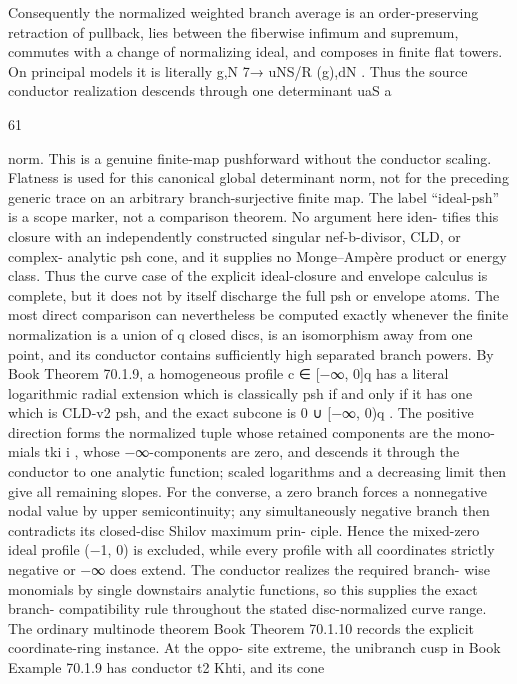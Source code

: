 \documentclass[11pt]{article}
\begin{document}
\begin{OriginalTaskDATA}
Consequently the normalized weighted branch average is an order-preserving retraction of
pullback, lies between the ﬁberwise inﬁmum and supremum, commutes with a change of
normalizing ideal, and composes in ﬁnite ﬂat towers. On principal models it is literally
 g,N 7→ uNS/R (g),dN . Thus the source conductor realization descends through one determinant
uaS      a



                                                      61

norm. This is a genuine ﬁnite-map pushforward without the conductor scaling. Flatness is
used for this canonical global determinant norm, not for the preceding generic trace on an
arbitrary branch-surjective ﬁnite map.
    The label “ideal-psh” is a scope marker, not a comparison theorem. No argument here iden-
tiﬁes this closure with an independently constructed singular nef-b-divisor, CLD, or complex-
analytic psh cone, and it supplies no Monge–Ampère product or energy class. Thus the curve
case of the explicit ideal-closure and envelope calculus is complete, but it does not by itself
discharge the full psh or envelope atoms.
    The most direct comparison can nevertheless be computed exactly whenever the ﬁnite
normalization is a union of q closed discs, is an isomorphism away from one point, and its
conductor contains suﬃciently high separated branch powers. By Book Theorem 70.1.9, a
homogeneous proﬁle c ∈ [−∞, 0]q has a literal logarithmic radial extension which is classically
psh if and only if it has one which is CLD-v2 psh, and the exact subcone is
                                        {0} ∪ [−∞, 0)q .
The positive direction forms the normalized tuple whose retained components are the mono-
mials tki i , whose −∞-components are zero, and descends it through the conductor to one
analytic function; scaled logarithms and a decreasing limit then give all remaining slopes.
For the converse, a zero branch forces a nonnegative nodal value by upper semicontinuity;
any simultaneously negative branch then contradicts its closed-disc Shilov maximum prin-
ciple. Hence the mixed-zero ideal proﬁle (−1, 0) is excluded, while every proﬁle with all
coordinates strictly negative or −∞ does extend. The conductor realizes the required branch-
wise monomials by single downstairs analytic functions, so this supplies the exact branch-
compatibility rule throughout the stated disc-normalized curve range. The ordinary multinode
theorem Book Theorem 70.1.10 records the explicit coordinate-ring instance. At the oppo-
site extreme, the unibranch cusp in Book Example 70.1.9 has conductor t2 Khti, and its cone

\end{OriginalTaskDATA}
\end{document}
